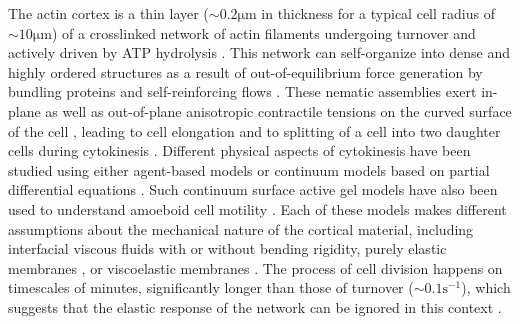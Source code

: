
The actin cortex is a thin layer ($\sim0.2 \si{\micro \meter}$ in thickness for a typical
cell radius of $\sim 10 \si{\micro \meter}$) of a crosslinked network of actin filaments undergoing turnover and actively driven by ATP hydrolysis \cite{chugh2018}. This network can self-organize into dense and highly ordered structures as a result of out-of-equilibrium force generation by  bundling proteins \cite{cortes2018, leite2019,turlier2014} and self-reinforcing flows \cite{khaliullin2018}. These nematic assemblies exert in-plane as well as out-of-plane anisotropic contractile tensions on the curved surface of the cell \cite{cortes2018, leite2019,kelkar2020}, leading to cell elongation and to splitting of a cell into two daughter cells during cytokinesis \cite{turlier2014, turlier2021}.
Different physical aspects of cytokinesis have been studied using either agent-based models \cite{pinto2012, bidone2014, bidone2017} or continuum models based on partial differential equations \cite{greenspan1978, mietke2019_2, mietke2019, koyama2012,gladilin2015,biron2005,salbreux2009,turlier2014,sain2015,zhao2016}. Such continuum surface active gel models have also been used to understand amoeboid cell motility \cite{callan2013,lim2013,Ruprecht:2015aa,lee2018,torres2019,moreno2020, wang2021}. Each of these models makes different assumptions about the mechanical nature of the cortical material, including interfacial viscous fluids with \cite{greenspan1978, mietke2019_2, mietke2019} or without \cite{turlier2014,torres2019,biron2005,sain2015,zhao2016} bending rigidity, purely elastic membranes \cite{koyama2012,gladilin2015}, or viscoelastic membranes \cite{akkacs1980,poirier2012}. The process of cell division happens on timescales of minutes, significantly longer than those of turnover ($\sim 0.1 \si{\second}^{-1}$), which suggests that the elastic response of the network  can be ignored in this context  \cite{salbreux2009}.


